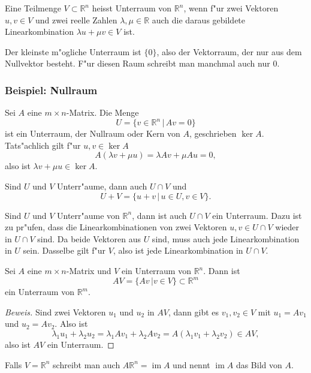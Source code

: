 \begin{definition}
Eine Teilmenge $V\subset\mathbb R^n$ heisst Unterraum von $\mathbb R^n$,
wenn f"ur zwei Vektoren
$u,v\in V$ und zwei reelle Zahlen $\lambda,\mu\in\mathbb R$
auch die daraus gebildete Linearkombination
$\lambda u+\mu v\in V$ ist.
\end{definition}

Der kleinste m"ogliche Unterraum ist $\{0\}$, also der Vektorraum, der nur aus
dem Nullvektor besteht. F"ur diesen Raum schreibt man manchmal auch nur $0$.

\subsubsection{Beispiel: Nullraum}
Sei $A$ eine $m\times n$-Matrix. Die Menge
\[
U=\{v\in\mathbb R^n\,|\,Av=0\}
\]
ist ein Unterraum, der Nullraum oder Kern von $A$, geschrieben
$\operatorname{ker}A$. Tats"achlich gilt f"ur $u,v\in\operatorname{ker}A$
\[
A(\lambda v+\mu u)=\lambda Av+\mu Au=0,
\]
also ist $\lambda v+\mu u\in\operatorname{ker}A$.

\begin{satz} Sind $U$ und $V$ Unterr"aume, dann auch $U\cap V$ und
\[
U+V=\{u+v\,|\,u\in U,v\in V\}.
\]
\end{satz}

Sind $U$ und $V$ Unterr"aume von $\mathbb R^n$, dann ist auch
$U\cap V$ ein Unterraum. Dazu ist zu pr"ufen, dass die Linearkombinationen
von zwei Vektoren $u,v\in U\cap V$ wieder in $U\cap V$ sind. Da beide
Vektoren aus $U$ sind, muss auch jede Linearkombination in $U$ sein. Dasselbe
gilt f"ur $V$, also ist jede Linearkombination in $U\cap V$.

\begin{satz}
Sei $A$ eine $m\times n$-Matrix und $V$ ein Unterraum von $\mathbb R^n$.
Dann ist
\[
AV=\{ Av\,|v\in V\}\subset\mathbb R^m
\]
ein Unterraum von $\mathbb R^m$.
\end{satz}
\begin{proof}[Beweis]
Sind zwei Vektoren $u_1$ und $u_2$ in $AV$, dann gibt es $v_1,v_2\in V$ mit
$u_1=Av_1$ und $u_2=Av_2$. Also ist
\[
\lambda_1u_1+\lambda_2u_2
=
\lambda_1Av_1+\lambda_2Av_2
=
A(\lambda_1v_1+\lambda_2v_2)\in AV,
\]
also ist $AV$ ein Unterraum.
\end{proof}
Falls $V=\mathbb R^n$ schreibt man auch $A\mathbb R^n=\operatorname{im}A$
und nennt $\operatorname{im}A$ das Bild von $A$.

